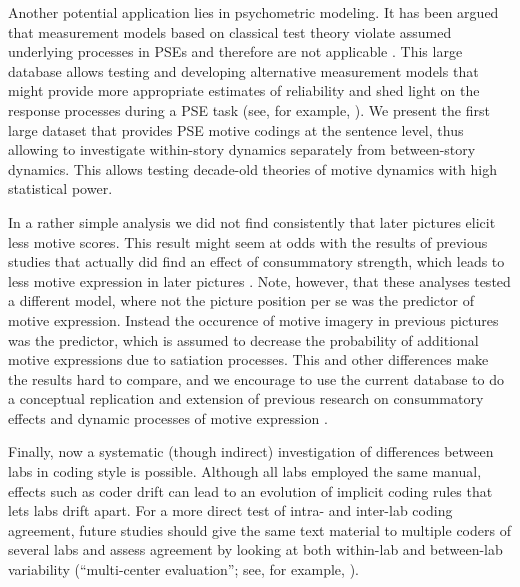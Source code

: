 \documentclass[man,a4paper,mask]{apa6}\usepackage[]{graphicx}\usepackage[]{color}
\begin{document}
Another potential application lies in psychometric modeling. It has been argued that measurement models based on classical test theory violate assumed underlying processes in PSEs and therefore are not applicable \parencite{atkinson_studying_1981,hibbard_critique_2003,schultheiss_reliability_2008}. This large database allows testing and developing alternative measurement models that might provide more appropriate estimates of reliability and shed light on the response processes during a PSE task (see, for example, ). We present the first large dataset that provides PSE motive codings at the sentence level, thus allowing to investigate within-story dynamics separately from between-story dynamics. This allows testing decade-old theories of motive dynamics with high statistical power. 

In a rather simple analysis we did not find consistently that later pictures elicit less motive scores. This result might seem at odds with the results of previous studies that actually did find an effect of consummatory strength, which leads to less motive expression in later pictures \parencite{tuerlinckx_measuring_2002,lang_DynamicThurstonianItem_2014}. Note, however, that these analyses tested a different model, where not the picture position per se was the predictor of motive expression. Instead the occurence of motive imagery in previous pictures was the predictor, which is assumed to decrease the probability of additional motive expressions due to satiation processes. This and other differences make the results hard to compare, and we encourage to use the current database to do a conceptual replication and extension of previous research on consummatory effects and dynamic processes of motive expression \parencite{atkinson_dynamics_1970}.

Finally, now a systematic (though indirect) investigation of differences between labs in coding style is possible. Although all labs employed the same manual, effects such as coder drift \parencite{schultheiss_MeasuringImplicitMotives_2007} can lead to an evolution of implicit coding rules that lets labs drift apart. For a more direct test of intra- and inter-lab coding agreement, future studies should give the same text material to multiple coders of several labs and assess agreement by looking at both within-lab and between-lab variability (``multi-center evaluation''; see, for example, ).
\end{document}
